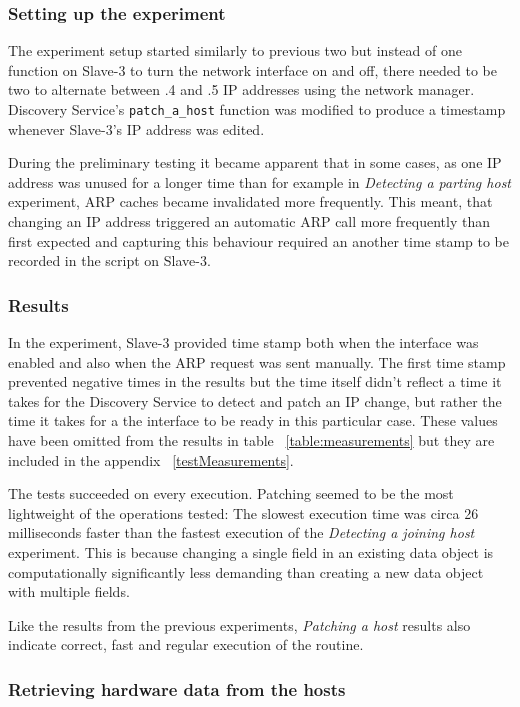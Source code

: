 \subsubsection*{Setting up the experiment}

The experiment setup started similarly to previous two but instead of one function on Slave-3 to turn the network interface on and off, there needed to be two to alternate between .4 and .5 IP addresses using the network manager. Discovery Service's \verb|patch_a_host| function was modified to produce a timestamp whenever Slave-3's IP address was edited.

During the preliminary testing it became apparent that in some cases, as one IP address was unused for a longer time than for example in \textit{Detecting a parting host} experiment, ARP caches became invalidated more frequently. This meant, that changing an IP address triggered an automatic ARP call more frequently than first expected and capturing this behaviour required an another time stamp to be recorded in the script on Slave-3.

\subsubsection*{Results}

In the experiment, Slave-3 provided time stamp both when the interface was enabled and also when the ARP request was sent manually. The first time stamp prevented negative times in the results but the time itself didn't reflect a time it takes for the Discovery Service to detect and patch an IP change, but rather the time it takes for a the interface to be ready in this particular case. These values have been omitted from the results in table ~\ref{table:measurements} but they are included in the appendix ~\ref{testMeasurements}.

The tests succeeded on every execution. Patching seemed to be the most lightweight of the operations tested: The slowest execution time was circa 26 milliseconds faster than the fastest execution of the \textit{Detecting a joining host} experiment. This is because changing a single field in an existing data object is computationally significantly less demanding than creating a new data object with multiple fields.

Like the results from the previous experiments, \textit{Patching a host} results also indicate correct, fast and regular execution of the routine.

\subsubsection{Retrieving hardware data from the hosts}

